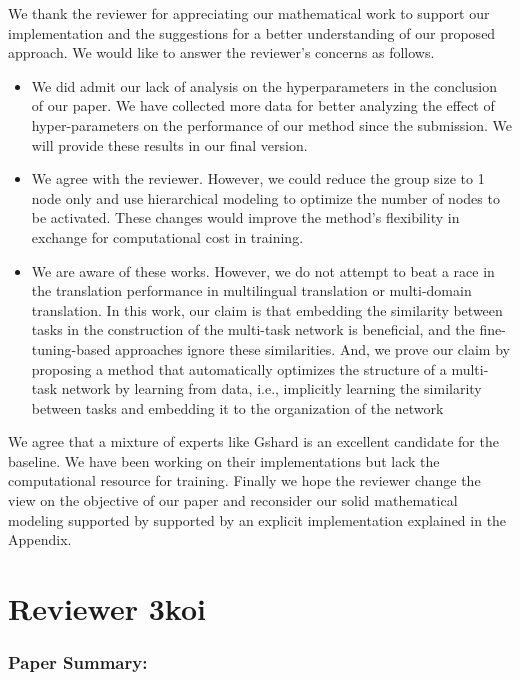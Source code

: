\documentclass[12pt,times,a4paper,twoside]{article}
\theoremstyle{definition}
\begin{document}
{\color{blue}
We thank the reviewer for appreciating our mathematical work to support our implementation and the suggestions for a better understanding of our proposed approach. We would like to answer the reviewer's concerns as follows.

\begin{itemize}
\item We did admit our lack of analysis on the hyperparameters in the conclusion of our paper. We have collected more data for better analyzing the effect of hyper-parameters on the performance of our method since the submission. We will provide these results in our final version.
\item We agree with the reviewer. However, we could reduce the group size to 1 node only and use hierarchical modeling to optimize the number of nodes to be activated. These changes would improve the method's flexibility in exchange for computational cost in training.
\item We are aware of these works. However, we do not attempt to beat a race in the translation performance in multilingual translation or multi-domain translation. In this work, our claim is that embedding the similarity between tasks in the construction of the multi-task network is beneficial, and the fine-tuning-based approaches ignore these similarities. And, we prove our claim by proposing a method that automatically optimizes the structure of a multi-task network by learning from data, i.e., implicitly learning the similarity between tasks and embedding it to the organization of the network
\end{itemize}

We agree that a mixture of experts like Gshard is an excellent candidate for the baseline. We have been working on their implementations but lack the computational resource for training. Finally we hope the reviewer change the view on the objective of our paper and reconsider our solid mathematical modeling supported by supported by an explicit implementation explained in the Appendix.
}
\section*{Reviewer 3koi}

\subsubsection*{Paper Summary:}
\end{document}
